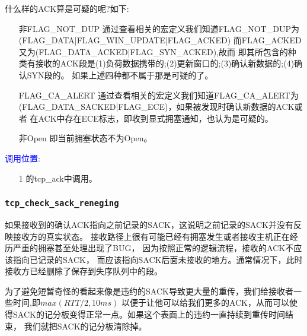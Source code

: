    什么样的ACK算是可疑的呢?如下:
\begin{enumerate}
\item[非FLAG\_NOT\_DUP] 通过查看相关的宏定义我们知道FLAG\_NOT\_DUP为(FLAG\_DATA|FLAG\_WIN\_UPDATE|FLAG\_ACKED)
                        而FLAG\_ACKED又为(FLAG\_DATA\_ACKED|FLAG\_SYN\_ACKED),故而
                        即其所包含的种类有接收的ACK段是(1)负荷数据携带的;(2)更新窗口的;(3)确认新数据的;(4)确认SYN段的。
                        如果上述四种都不属于那是可疑的了。
            
\item[FLAG\_CA\_ALERT]  通过查看相关的宏定义我们知道FLAG\_CA\_ALERT为(FLAG\_DATA\_SACKED|FLAG\_ECE)，如果被发现时确认新数据的ACK或者
                        在ACK中存在ECE标志，即收到显式拥塞通知，也认为是可疑的。\color{red}{似乎和上面的有矛盾，}
\item[非Open]           即当前拥塞状态不为Open。
\end{enumerate}

        \textcolor{blue}{调用位置}:
            \begin{enumerate}
                \item[1]        \label{ClientReceiveSYN+ACK:tcp_ack}的tcp\_ack中调用。
            \end{enumerate}

        \subsubsection{\texttt{tcp_check_sack_reneging}}
            \label{TCPACKCheck:tcp_check_sack_reneging}
            如果接收到的确认ACK指向之前记录的SACK，这说明之前记录的SACK并没有反映接收方的真实状态。
            接收路径上很有可能已经有拥塞发生或者接收主机正在经历严重的拥塞甚至处理出现了BUG，
            因为按照正常的逻辑流程，接收的ACK不应该指向已记录的SACK，
            而应该指向SACK后面未接收的地方。通常情况下，此时接收方已经删除了保存到失序队列中的段。
            
            为了避免短暂奇怪的看起来像是违约的SACK导致更大量的重传，我们给接收者一些时间,即$max(RTT/2, 10ms)$
            以便于让他可以给我们更多的ACK，从而可以使得SACK的记分板变得正常一点。如果这个表面上的违约一直持续到重传时间结束，
            我们就把SACK的记分板清除掉。

